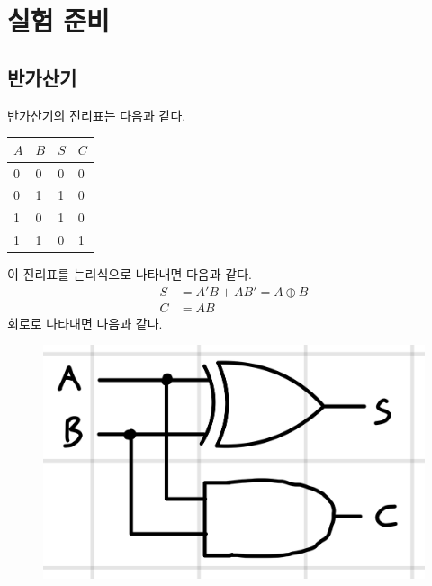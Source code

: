 \documentclass{scrartcl}
\begin{document}
\section{실험 준비}
\subsection{반가산기}
반가산기의 진리표는 다음과 같다.
\begin{table}[H]
  \centering
  \begin{tabular}{ll|ll}
    \hline
    \(A\) & \(B\) & \(S\) & \(C\) \\
    \hline
    0 & 0 & 0 & 0 \\
    0 & 1 & 1 & 0 \\
    1 & 0 & 1 & 0 \\
    1 & 1 & 0 & 1 \\
    \hline
  \end{tabular}
\end{table}
이 진리표를 는리식으로 나타내면 다음과 같다.
\begin{align*}
  S &= A' B + AB' = A \oplus B \\
  C &= AB
\end{align*}
회로로 나타내면 다음과 같다.
\begin{figure}[H]
  \centering
  \includegraphics[width=0.3\linewidth]{half-adder.jpeg}
\end{figure}
\end{document}
